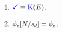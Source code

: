 \begin{minipage}[t]{.55\textwidth}
\begin{enumerate}[topsep=0pt,label=(\textsc{w}\arabic*),ref=\textsc{w}\arabic*]
  \item \label {write-term-ca-addr}
    \begin{math}
      \aTerm \riff
      \kappaE{},
    \end{math}
    \item \label{write-phi-ca-addr}
      $\phi_e[N/\mathit{s}_{d}]=\phi_e$.
  \end{enumerate}
\end{minipage}

